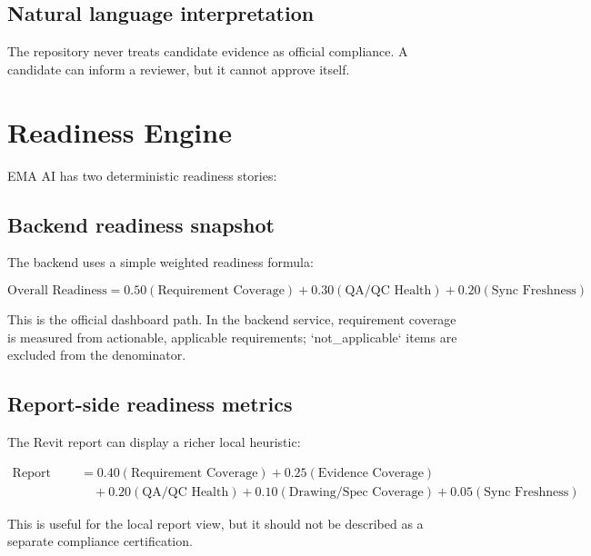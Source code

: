 \documentclass[10pt,letterpaper]{article}
\begin{document}
\subsection{Natural language interpretation}

\begin{tcolorbox}[colback=emaSoft]
The repository never treats candidate evidence as official compliance. A candidate can inform a reviewer, but it cannot approve itself.
\end{tcolorbox}

\section{Readiness Engine}

EMA AI has two deterministic readiness stories:

\subsection{Backend readiness snapshot}

The backend uses a simple weighted readiness formula:

\[
\text{Overall Readiness} = 0.50(\text{Requirement Coverage}) + 0.30(\text{QA/QC Health}) + 0.20(\text{Sync Freshness})
\]

This is the official dashboard path. In the backend service, requirement coverage is measured from actionable, applicable requirements; `not_applicable` items are excluded from the denominator.

\subsection{Report-side readiness metrics}

The Revit report can display a richer local heuristic:

\[
\begin{aligned}
\text{Report Readiness} &= 0.40(\text{Requirement Coverage}) + 0.25(\text{Evidence Coverage}) \\
&\quad + 0.20(\text{QA/QC Health}) + 0.10(\text{Drawing/Spec Coverage}) + 0.05(\text{Sync Freshness})
\end{aligned}
\]

This is useful for the local report view, but it should not be described as a separate compliance certification.
\end{document}
